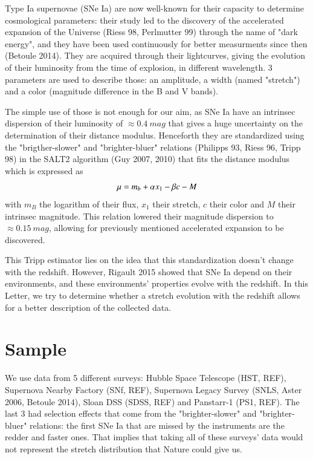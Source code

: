 \documentclass{aa}
\begin{document}
Type Ia supernovae (SNe Ia) are now well-known for their capacity to determine
cosmological parameters: their study led to the discovery of the accelerated
expansion of the Universe (Riess 98, Perlmutter 99) through the name of "dark
energy", and they have been used continuously for better measurments since then
(Betoule 2014). They are acquired through their lightcurves, giving the
evolution of their luminosity from the time of explosion, in different
wavelength. 3 parameters are used to describe those: an amplitude, a width
(named "stretch") and a color (magnitude difference in the B and V bands).

The simple use of those is not enough for our aim, as SNe Ia have an intrinsec
dispersion of their luminosity of $\approx 0.4~mag$ that gives a huge
uncertainty on the determination of their distance modulus. Henceforth they are
standardized using the "brigther-slower" and "brighter-bluer" relations
(Philipps 93, Riess 96, Tripp 98) in the SALT2 algorithm (Guy 2007, 2010) that
fits the distance modulus which is expressed as
\begin{equation}
    \mu = m_b + \alpha x_1 - \beta c - M
\end{equation}
with $m_B$ the logarithm of their flux, $x_1$ their stretch, $c$ their color and
$M$ their intrinsec magnitude. This relation lowered their magnitude dispersion
to $\approx 0.15~mag$, allowing for previously mentioned accelerated
expansion to be discovered.

This Tripp estimator lies on the idea that this standardization doesn't change
with the redshift. However, Rigault 2015 showed that SNe Ia depend on their
environments, and these environments' properties evolve with the redshift. In
this Letter, we try to determine whether a stretch evolution with the redshift
allows for a better description of the collected data.

\section{Sample}\label{sec:sam}

We use data from 5 different surveys: Hubble Space Telescope (HST, REF),
Supernova Nearby Factory (SNf, REF), Supernova Legacy Survey (SNLS, Aster 2006,
Betoule 2014), Sloan DSS (SDSS, REF) and Panstarr-1 (PS1, REF). The last 3 had
selection effects that come from the "brighter-slower" and "brighter-bluer"
relations: the first SNe Ia that are missed by the instruments are the redder
and faster ones. That implies that taking all of these surveys' data would not
represent the stretch distribution that Nature could give us.
\end{document}
